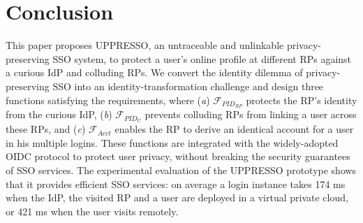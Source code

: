 \section{Conclusion}
\label{sec:conclusion}
This paper proposes UPPRESSO, an untraceable and unlinkable privacy-preserving SSO system,
 to protect a user's online profile at different RPs against a curious IdP and colluding RPs.
We convert the identity dilemma of privacy-preserving SSO into an identity-transformation challenge
 and design three functions satisfying the requirements,
 where (\emph{a}) $\mathcal{F}_{PID_{RP}}$ protects the RP's identity from the curious IdP,
(\emph{b})  $\mathcal{F}_{PID_{U}}$ prevents colluding RPs from linking a user across these RPs,
 and (\emph{c}) $\mathcal{F}_{Acct}$ enables the RP to derive an identical account for a user in his multiple logins.
These functions are integrated with the widely-adopted OIDC protocol
    to protect user privacy,
    without breaking the security guarantees of SSO services.
The experimental evaluation of the UPPRESSO prototype shows
 that it provides efficient SSO services:
  on average a login instance takes 174 ms when the IdP, the visited RP and a user are deployed in a virtual private cloud, or 421 ms when the user visits remotely.



\newpage
